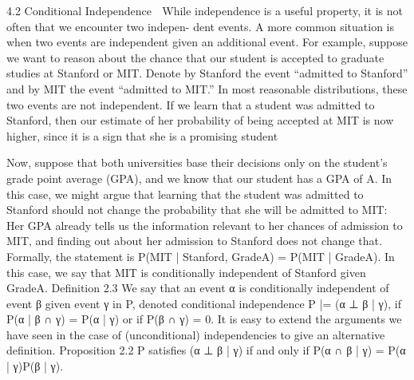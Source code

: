 4.2 Conditional Independence
 While independence is a useful property, it is not often that we encounter two indepen- dent events. A more common situation is when two events are independent given an additional event. For example, suppose we want to reason about the chance that our student is accepted to graduate studies at Stanford or MIT. Denote by Stanford the event “admitted to Stanford” and by MIT the event “admitted to MIT.” In most reasonable distributions, these two events are not independent. If we learn that a student was admitted to Stanford, then our estimate of her probability of being accepted at MIT is now higher, since it is a sign that she is a promising student

Now, suppose that both universities base their decisions only on the student’s grade point average (GPA), and we know that our student has a GPA of A. In this case, we might argue that learning that the student was admitted to Stanford should not change the probability that she will be admitted to MIT: Her GPA already tells us the information relevant to her chances of admission to MIT, and finding out about her admission to Stanford does not change that. Formally, the statement is P(MIT | Stanford, GradeA) = P(MIT | GradeA). In this case, we say that MIT is conditionally independent of Stanford given GradeA. Definition 2.3 We say that an event α is conditionally independent of event β given event γ in P, denoted conditional independence P |= (α ⊥ β | γ), if P(α | β ∩ γ) = P(α | γ) or if P(β ∩ γ) = 0. It is easy to extend the arguments we have seen in the case of (unconditional) independencies to give an alternative definition. Proposition 2.2 P satisfies (α ⊥ β | γ) if and only if P(α ∩ β | γ) = P(α | γ)P(β | γ).

